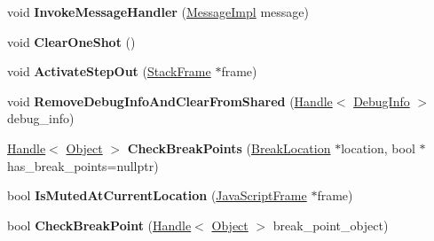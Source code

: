 \begin{DoxyCompactItemize}
\item 
void {\bfseries Invoke\+Message\+Handler} (\hyperlink{classv8_1_1internal_1_1_message_impl}{Message\+Impl} message)\hypertarget{classv8_1_1internal_1_1_debug_a51caab838afaba943e7025f51e580c8d}{}\label{classv8_1_1internal_1_1_debug_a51caab838afaba943e7025f51e580c8d}

\item 
void {\bfseries Clear\+One\+Shot} ()\hypertarget{classv8_1_1internal_1_1_debug_a76ccec4ef03cdd67850958e288b8a50d}{}\label{classv8_1_1internal_1_1_debug_a76ccec4ef03cdd67850958e288b8a50d}

\item 
void {\bfseries Activate\+Step\+Out} (\hyperlink{classv8_1_1_stack_frame}{Stack\+Frame} $\ast$frame)\hypertarget{classv8_1_1internal_1_1_debug_a37cc8a71a8c20a6c28d0dbe51a703b41}{}\label{classv8_1_1internal_1_1_debug_a37cc8a71a8c20a6c28d0dbe51a703b41}

\item 
void {\bfseries Remove\+Debug\+Info\+And\+Clear\+From\+Shared} (\hyperlink{classv8_1_1internal_1_1_handle}{Handle}$<$ \hyperlink{classv8_1_1internal_1_1_debug_info}{Debug\+Info} $>$ debug\+\_\+info)\hypertarget{classv8_1_1internal_1_1_debug_ab2726df664a8592c9605b29833bcdf6d}{}\label{classv8_1_1internal_1_1_debug_ab2726df664a8592c9605b29833bcdf6d}

\item 
\hyperlink{classv8_1_1internal_1_1_handle}{Handle}$<$ \hyperlink{classv8_1_1internal_1_1_object}{Object} $>$ {\bfseries Check\+Break\+Points} (\hyperlink{classv8_1_1internal_1_1_break_location}{Break\+Location} $\ast$location, bool $\ast$has\+\_\+break\+\_\+points=nullptr)\hypertarget{classv8_1_1internal_1_1_debug_a045a1c3e65e3a80e6a7e9ec46b426f52}{}\label{classv8_1_1internal_1_1_debug_a045a1c3e65e3a80e6a7e9ec46b426f52}

\item 
bool {\bfseries Is\+Muted\+At\+Current\+Location} (\hyperlink{classv8_1_1internal_1_1_java_script_frame}{Java\+Script\+Frame} $\ast$frame)\hypertarget{classv8_1_1internal_1_1_debug_aecd3a497fb83befbaf70926ee9e68c85}{}\label{classv8_1_1internal_1_1_debug_aecd3a497fb83befbaf70926ee9e68c85}

\item 
bool {\bfseries Check\+Break\+Point} (\hyperlink{classv8_1_1internal_1_1_handle}{Handle}$<$ \hyperlink{classv8_1_1internal_1_1_object}{Object} $>$ break\+\_\+point\+\_\+object)\hypertarget{classv8_1_1internal_1_1_debug_a8b60622974b83679ae6a1b87494cd236}{}\label{classv8_1_1internal_1_1_debug_a8b60622974b83679ae6a1b87494cd236}


\end{DoxyCompactItemize}
